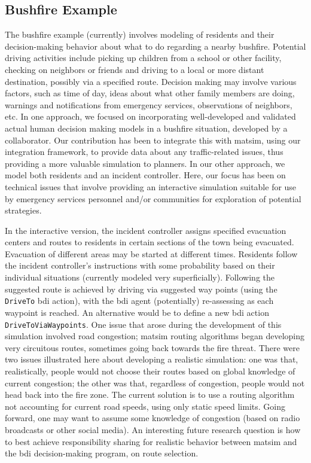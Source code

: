 \subsection{Bushfire Example}
The bushfire example (currently) involves modeling of residents and
their decision-making behavior about what to do regarding a nearby
bushfire. Potential driving activities include picking up children
from a school or other facility, checking on neighbors or friends
and driving to a local or more distant destination, possibly via a
specified route. Decision making may involve various factors, such as
time of day, ideas about what other family members are doing,
warnings and notifications from emergency services, observations of
neighbors, etc. In one approach, we focused on incorporating
well-developed and validated actual human decision making models in
a bushfire situation, developed by a collaborator. Our contribution
has been to integrate this with \gls{matsim}, using our integration
framework, to provide data about any traffic-related issues, thus
providing a more valuable simulation to planners. In our other
approach, we model both residents and an incident
controller. Here, our focus has been on technical issues that involve
providing an interactive simulation suitable for use by emergency
services personnel and/or communities for exploration of potential
strategies. 

In the interactive version, the incident controller assigns specified
evacuation centers and routes to residents in certain sections of
the town being evacuated. Evacuation of different areas may be started
at different times. Residents follow the incident
controller's instructions with some probability based on their individual situations
(currently modeled very superficially). Following the suggested route
is achieved by driving via suggested way points  (using the \lstinline{DriveTo} \gls{bdi}
action), with the \gls{bdi} agent (potentially) re-assessing as each
waypoint is reached. An alternative would be to define a new \gls{bdi}
action \lstinline{DriveToViaWaypoints}. One issue that arose during the
development of this simulation involved road congestion;
\gls{matsim} routing algorithms began developing very circuitous routes,
sometimes going back towards the fire threat. There were two issues illustrated
here about developing a realistic simulation: one was that,
realistically, people would not choose their routes based on global
knowledge of current congestion; the other was that, regardless of
congestion, people would not head back into the fire zone. The current
solution is to use a routing algorithm not accounting for 
current road speeds, using only static speed limits. Going forward, one
may want to assume some knowledge of congestion (based on radio
broadcasts or other social media). An interesting future research
question is how to best
achieve responsibility sharing for realistic behavior between
\gls{matsim} and the \gls{bdi} decision-making program, on route
selection. 

